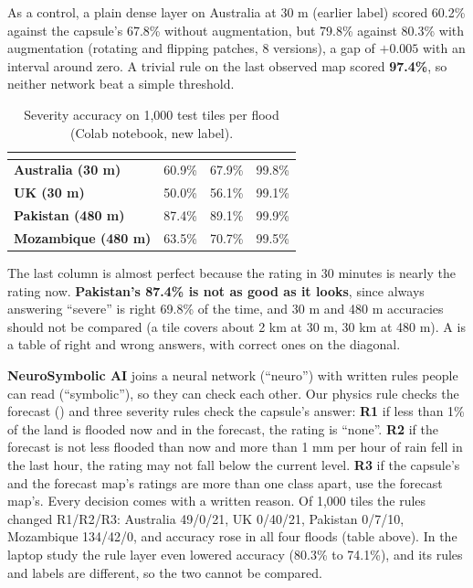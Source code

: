 As a control, a plain dense layer on Australia at 30 m (earlier label) scored 60.2\% against the capsule's 67.8\% without augmentation, but 79.8\% against 80.3\% with augmentation (rotating and flipping patches, 8 versions), a gap of $+0.005$ with an interval around zero. A trivial rule on the last observed map scored \textbf{97.4\%}, so neither network beat a simple threshold.

\begin{table}[!htbp]
\centering\small
\caption{Severity accuracy on 1,000 test tiles per flood (Colab notebook, new label).}\label{tab:caps}
\begin{tabularx}{\linewidth}{|>{\bfseries}p{3.6cm}|Y|Y|Y|}
\hline
{}  &  &  & \\ \hline
Australia (30 m) & 60.9\% & 67.9\% & 99.8\%\\ \hline
UK (30 m) & 50.0\% & 56.1\% & 99.1\%\\ \hline
Pakistan (480 m) & 87.4\% & 89.1\% & 99.9\%\\ \hline
Mozambique (480 m) & 63.5\% & 70.7\% & 99.5\%\\ \hline
\end{tabularx}
\end{table}

The last column is almost perfect because the rating in 30 minutes is nearly the rating now. \textbf{Pakistan's 87.4\% is not as good as it looks}, since always answering ``severe'' is right 69.8\% of the time, and 30 m and 480 m accuracies should not be compared (a tile covers about 2 km at 30 m, 30 km at 480 m). A  is a table of right and wrong answers, with correct ones on the diagonal.

\textbf{NeuroSymbolic AI} joins a neural network (``neuro'') with written rules people can read (``symbolic''), so they can check each other. Our physics rule checks the forecast () and three severity rules check the capsule's answer: \textbf{R1} if less than 1\% of the land is flooded now and in the forecast, the rating is ``none''. \textbf{R2} if the forecast is not less flooded than now and more than 1 mm per hour of rain fell in the last hour, the rating may not fall below the current level. \textbf{R3} if the capsule's and the forecast map's ratings are more than one class apart, use the forecast map's. Every decision comes with a written reason. Of 1,000 tiles the rules changed R1/R2/R3: Australia 49/0/21, UK 0/40/21, Pakistan 0/7/10, Mozambique 134/42/0, and accuracy rose in all four floods (table above). In the laptop study the rule layer even lowered accuracy (80.3\% to 74.1\%), and its rules and labels are different, so the two cannot be compared.

